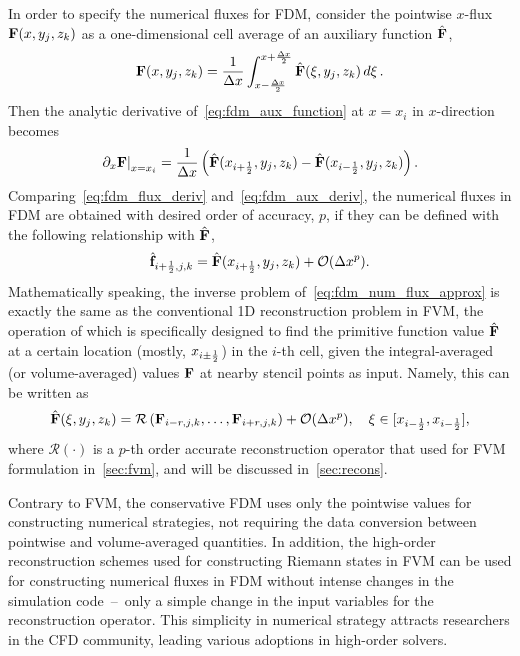 In order to specify the numerical fluxes for FDM, consider the pointwise \( x \)-flux \( \mathbf{F} (x, y_{j}, z_{k}) \)
as a one-dimensional cell average of an auxiliary function \( \hat{\mathbf{F}} \),
\begin{equation}\label{eq:fdm_aux_function}
    \mathbf{F}(x,y_j,z_k) = \frac{1}{\Delta x} \int_{x - \frac{\Delta x}{2}}^{x + \frac{\Delta x}{2}} \hat{\mathbf{F}}(\xi, y_j, z_k) \mathop{d\xi}.
\end{equation}
Then the analytic derivative of~\cref{eq:fdm_aux_function} at \( x = x_{i} \) in \( x \)-direction becomes
\begin{equation}\label{eq:fdm_aux_deriv}
    \left. \partial_{x} \mathbf{F} \right|_{x=x_{i}} =
    \frac{1}{\Delta x} \left(\hat{\mathbf{F}}(x_{{i+\frac{1}{2}}}, y_j, z_k) - \hat{\mathbf{F}}(x_{{i-\frac{1}{2}}}, y_j, z_k) \right).
\end{equation}
Comparing~\cref{eq:fdm_flux_deriv} and~\cref{eq:fdm_aux_deriv},
the numerical fluxes in FDM are obtained with desired order of accuracy, \( p \),
if they can be defined with
the following relationship with $\hat{\mathbf{F}}$,
\begin{equation}\label{eq:fdm_num_flux_approx}
    \hat{\mathbf{f}}_{{i+\frac{1}{2}},j,k} = \hat{\mathbf{F}} (x_{{i+\frac{1}{2}}},y_j,z_k) + \mathcal{O} (\Delta x^{p}).
\end{equation}
Mathematically speaking, the inverse problem of~\cref{eq:fdm_num_flux_approx} is exactly the same as
the conventional 1D reconstruction problem in FVM, the operation of which is specifically designed to
find the primitive function value $\hat{\mathbf{F}}$ at a certain location (mostly, $x_{i \pm \frac{1}{2}}$) in the $i$-th cell,
given the integral-averaged (or volume-averaged) values ${\mathbf{F}}$ at nearby stencil points
as input. Namely, this can be written as
\begin{equation}\label{eq:fdm_recon}
    \hat{\mathbf{F}}(\xi,y_j,z_k) = \mathcal{R}\left(\mathbf{F}_{i-r,j,k}, \dots, \mathbf{F}_{i+r,j,k}\right) + \mathcal{O} (\Delta x^p),
    \quad
    \xi \in [x_{{i-\frac{1}{2}}}, x_{{i-\frac{1}{2}}}],
\end{equation}
where \( \mathcal{R}(\cdot) \) is a $p$-th order accurate reconstruction operator
that used for FVM formulation in~\cref{sec:fvm}, and will be discussed in~\cref{sec:recons}.

Contrary to FVM, the conservative FDM uses only the pointwise values for constructing numerical strategies,
not requiring the data conversion between pointwise and volume-averaged quantities.
In addition, the high-order reconstruction schemes used for constructing Riemann states in FVM
can be used for constructing numerical fluxes in FDM
without intense changes in the simulation code~--~only a simple change in the input variables for the reconstruction operator.
This simplicity in numerical strategy attracts researchers in the CFD community, leading various adoptions in
high-order solvers.~\cite{jiang1996efficient,shu1998essentially,mignone2010high,christlieb2015picard,seal2016explicit}

